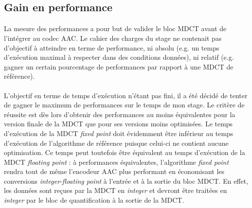\documentclass{article}
\begin{document}



    \subsection{Gain en performance}
    \paragraph{}
    La mesure des performances a pour but de valider le bloc MDCT avant de l'intégrer au codec AAC. Le cahier des charges du stage ne contenait pas d'objectif à atteindre en terme de performance, ni absolu (e.g. un temps d'exécution maximal à respecter dans des conditions données), ni relatif (e.g. gagner un certain pourcentage de performances par rapport à une MDCT de référence).

    \paragraph{}
    L'objectif en terme de temps d'exécution n'étant pas fini, il a été décidé de tenter de gagner le maximum de performances sur le temps de mon stage. Le critère de réussite est dès lors d'obtenir des performances au moins équivalentes pour la version finale de la MDCT que pour ses versions moins optimisées. Le temps d'exécution de la MDCT \emph{fixed point} doit évidemment être inférieur au temps d'exécution de l'algorithme de référence puisque celui-ci ne contient aucune optimisation. Ce temps peut toutefois être équivalent au temps d'exécution de la MDCT \emph{floating point} : à performances équivalentes, l'algorithme \emph{fixed point} rendra tout de même l'encodeur AAC plus performant en économisant les conversions \emph{integer}-\emph{floating point} à l'entrée et à la sortie du bloc MDCT. En effet, les données sont reçues par la MDCT en \emph{integer} et devront être traitées en \emph{integer} par le bloc de quantification à la sortie de la MDCT.
    
\end{document}

